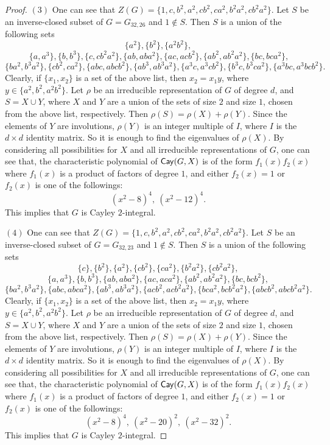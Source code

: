 \documentclass{amsart}
\def\Cay{{\sf Cay}} \def\Ker{{\sf Ker}}
\begin{document}
\begin{proof}
	$(3)$ One can see that $Z(G)=\{1,c,b^2,a^2,cb^2,ca^2,b^2a^2,cb^2a^2\}$.
	Let $S$ be an inverse-closed subset of $G=G_{32,26}$ and $1\notin S$. Then
	$S$ is a union of the following sets
	\[\{a^2\},\{b^2\},\{a^2b^2\},\]
	\[\  \{a, a^3\}, \{b, b^3\} ,\{ c, cb^2a^2 \},\{ ab, aba^2 \},\{ ac, acb^2 \},
	\{ ab^2, ab^2a^2 \},\{ bc, bca^2 \},\]
	\[\{ ba^2, b^3a^2 \},\{ cb^2, ca^2 \},\{ abc, abcb^2 \},
	\{ ab^3, ab^3a^2 \},\{ a^3c, a^3cb^2 \},\{ b^3c, b^3ca^2 \},\{ a^3bc, a^3bcb^2\}.
	\]
	Clearly, if $\{x_1,x_2\}$ is a set of the above list, then $x_2=x_1y$, where $y\in\{a^2,b^2,a^2b^2\}$. Let $\rho$ be an irreducible representation of $G$ of degree $d$, and $S=X\cup Y$, where $X$ and $Y$ are a union of the sets of size $2$ and size $1$, chosen from the above list,  respectively. Then $\rho(S)=\rho(X)+\rho(Y)$. Since the elements of $Y$ are involutions, $\rho(Y)$ is an integer multiple of $I$, where $I$ is the $d\times d$ identity matrix. So it is enough to find the eigenvalues of $\rho(X)$. By considering all possibilities for $X$ and all irreducible representations of $G$, one can see that, the characteristic polynomial of $\Cay(G,X)$ is of the form $f_1(x)f_2(x)$ where $f_1(x)$ is a product of factors of degree $1$, and either $f_2(x)=1$ or $f_2(x)$ is one of the followings:
	\[(x^2-8)^4,~(x^2-12)^4.\]
	This implies that $G$ is Cayley $2$-integral.
	
	$(4)$
	One can see that $Z(G)=\{1,c,b^2,a^2,cb^2,ca^2,b^2a^2,cb^2a^2\}$.
	Let $S$ be an inverse-closed subset of $G=G_{32,23}$ and $1\notin S$. Then
	$S$ is a union of the following sets
	\[\{c\}, \{b^2\}, \{a^2\}, \{cb^2\}, \{ca^2\}, \{b^2a^2\}, \{cb^2a^2\},\]
	\[ \{ a, a^3 \}, \{ b, b^3 \}, \{ ab, aba^2 \}, \{ ac, aca^2 \}, \{ ab^2, ab^2a^2 \}, \{ bc, bcb^2 \},\]
	\[\{ ba^2, b^3a^2 \}, \{ abc, abca^2 \}, \{ ab^3, ab^3a^2 \},
	\{ acb^2, acb^2a^2 \}, \{ bca^2, bcb^2a^2 \}, \{ abcb^2, abcb^2a^2 \}.
	\]
	Clearly, if $\{x_1,x_2\}$ is a set of the above list, then $x_2=x_1y$, where $y\in\{a^2,b^2,a^2b^2\}$. Let $\rho$ be an irreducible representation of $G$ of degree $d$, and $S=X\cup Y$, where $X$ and $Y$ are a union of the sets of size $2$ and size $1$, chosen from the above list,  respectively. Then $\rho(S)=\rho(X)+\rho(Y)$. Since the elements of $Y$ are involutions, $\rho(Y)$ is an integer multiple of $I$, where $I$ is the $d\times d$ identity matrix. So it is enough to find the eigenvalues of $\rho(X)$. By considering all possibilities for $X$ and all irreducible representations of $G$, one can see that, the characteristic polynomial of $\Cay(G,X)$ is of the form $f_1(x)f_2(x)$ where $f_1(x)$ is a product of factors of degree $1$, and either $f_2(x)=1$ or $f_2(x)$ is one of the followings:
	\[(x^2-8)^4,~(x^2-20)^2,~(x^2-32)^2.\]
	This implies that $G$ is Cayley $2$-integral.
\end{proof}
\end{document}
